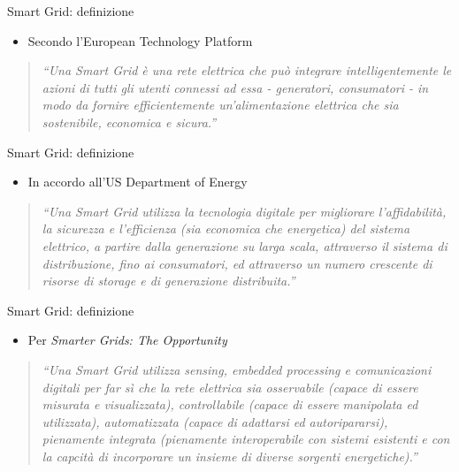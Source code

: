 \begin{frame}{Smart Grid: definizione}
\begin{itemize}
\item Secondo l’European Technology Platform
\end{itemize}
\begin{quote}
\textit{``Una Smart Grid è una rete elettrica che può integrare intelligentemente le azioni di tutti gli utenti connessi ad essa - generatori, consumatori - in modo da fornire efficientemente un’alimentazione elettrica che sia sostenibile, economica e sicura.”}
\end{quote}
\end{frame}

\begin{frame}{Smart Grid: definizione}
\begin{itemize}
\item In accordo all’US Department of Energy
\end{itemize}
\begin{quote}
\textit{``Una Smart Grid utilizza la tecnologia digitale per migliorare l’affidabilità, la sicurezza e l’efficienza (sia economica che energetica) del sistema elettrico, a partire dalla generazione su larga scala, attraverso il sistema di distribuzione, fino ai consumatori, ed attraverso un numero crescente di risorse di storage e di generazione distribuita.”}
\end{quote}
\end{frame}


\begin{frame}{Smart Grid: definizione}
\begin{itemize}
\item Per \textit{Smarter Grids: The Opportunity}
\end{itemize}
\begin{quote}
\textit{``Una Smart Grid utilizza sensing, embedded processing e comunicazioni digitali per far sì che la rete elettrica sia osservabile (capace di essere misurata e visualizzata), controllabile (capace di essere manipolata ed utilizzata), automatizzata (capace di adattarsi ed autoripararsi), pienamente integrata (pienamente interoperabile con sistemi esistenti e con la capcità di incorporare un insieme di diverse sorgenti energetiche).”}
\end{quote}
\end{frame}

